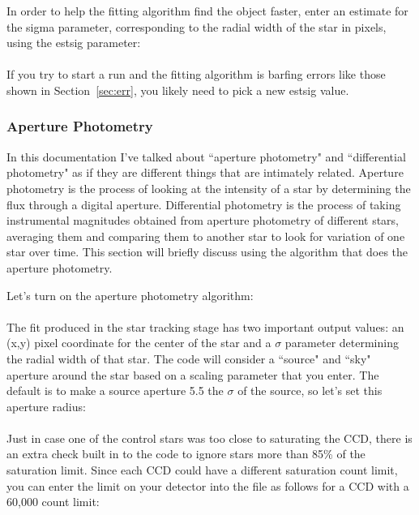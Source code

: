 \documentclass{article}
\begin{document}
	In order to help the fitting algorithm find the object faster, enter an estimate for the sigma parameter, corresponding to the radial width of the star in pixels, using the \textsf{estsig} parameter: \\
	
\indent {}\\

If you try to start a run and the fitting algorithm is barfing errors like those shown in Section~\ref{sec:err}, you likely need to pick a new \textsf{estsig} value. 

\subsubsection{Aperture Photometry}

In this documentation I've talked about ``aperture photometry" and ``differential photometry" as if they are different things that are intimately related. Aperture photometry is the process of looking at the intensity of a star by determining the flux through a digital aperture. Differential photometry is the process of taking instrumental magnitudes obtained from aperture photometry of different stars, averaging them and comparing them to another star to look for variation of one star over time. This section will briefly discuss using the algorithm that does the aperture photometry.

	Let's turn on the aperture photometry algorithm:\\
	
\indent {}\\

	The fit produced in the star tracking stage has two important output values: an (x,y) pixel coordinate for the center of the star and a $ \sigma $ parameter determining the radial width of that star. The code will consider a ``source" and ``sky" aperture around the star based on a scaling parameter that you enter. The default is to make a source aperture 5.5 the $ \sigma $ of the source, so let's set this aperture radius:\\
	
	\indent {}\\
	
	Just in case one of the control stars was too close to saturating the CCD, there is an extra check built in to the code to ignore stars more than 85\% of the saturation limit. Since each CCD could have a different saturation count limit, you can enter the limit on your detector into the  file as follows for a CCD with a 60,000 count limit: \\
	
\end{document}
